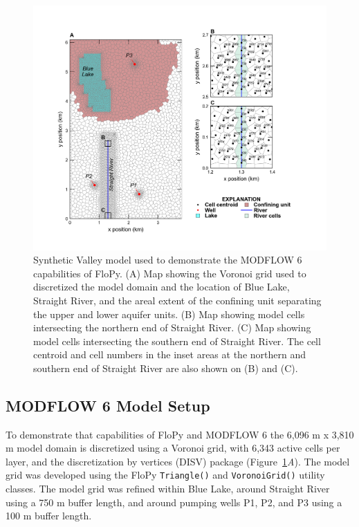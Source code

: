 \documentclass[11pt, oneside]{article}  	%
\begin{document}
\begin{figure}[ht!]
	\begin{center}
		\includegraphics{figures/mv_voronoi_river_discretization.png}
	\end{center}
	\caption{Synthetic Valley model used to demonstrate the MODFLOW 6 capabilities of FloPy. (A) Map showing the Voronoi grid used to discretized the model domain and the location of Blue Lake, Straight River, and the areal extent of the confining unit separating the upper and lower aquifer units. (B) Map showing model cells intersecting the northern end of Straight River. (C) Map showing model cells intersecting the southern end of Straight River. The cell centroid and cell numbers in the inset areas at the northern and southern end of Straight River are also shown on (B) and (C).}
	\label{fig:mvgrid}
\end{figure}

\subsection{MODFLOW 6 Model Setup}

To demonstrate that capabilities of FloPy and MODFLOW 6 the 6,096 m x 3,810 m model domain is discretized using a Voronoi grid, with 6,343 active cells per layer, and the discretization by vertices (DISV) package (Figure~\ref{fig:mvgrid}\textit{A}). The model grid was developed using the FloPy \texttt{Triangle()} and \texttt{VoronoiGrid()} utility classes. The model grid was refined within Blue Lake, around Straight River using a 750 m buffer length, and around pumping wells P1, P2, and P3 using a 100 m buffer length.
\end{document}
